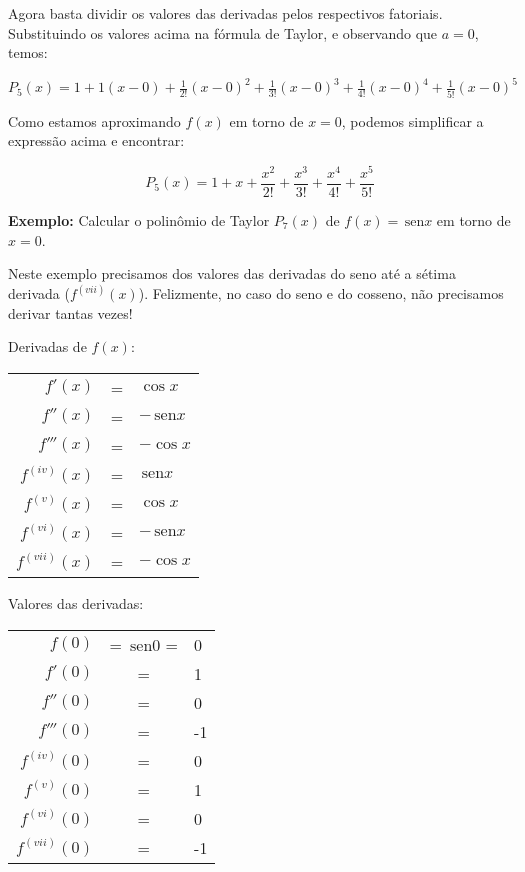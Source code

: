 \documentclass[a4paper]{article}
\providecommand{\sin}{} \renewcommand{\sin}{\hspace{2pt}\mathrm{sen}}
\begin{document}
Agora basta dividir os valores das derivadas pelos respectivos fatoriais.
Substituindo os valores acima na fórmula de Taylor, e observando que $a=0$, temos:

$P_5(x) = 1+ 1(x-0) + \frac{1}{2!}(x-0)^2 + \frac{1}{3!}(x-0)^3 + \frac{1}{4!}(x-0)^4 + \frac{1}{5!}(x-0)^5$

Como estamos aproximando $f(x)$ em torno de $x=0$, podemos simplificar a expressão acima e encontrar:

\begin{displaymath}
  P_5(x) = 1+ x + \frac{x^2}{2!} + \frac{x^3}{3!} + \frac{x^4}{4!} + \frac{x^5}{5!}
\end{displaymath}

{\bf Exemplo:} Calcular o polinômio de Taylor $P_7(x)$ de $f(x)=\sin x$ em torno de $x=0$.

Neste exemplo precisamos dos valores das derivadas do seno até a sétima derivada ($f^{(vii)}(x)$).
Felizmente, no caso do seno e do cosseno, não precisamos derivar tantas vezes!

\begin{multicols}{2}

Derivadas de $f(x)$:

  \begin{tabular}{rcl}
    $f'(x)$ &=& $\cos x$\\
    $f''(x)$ &=& $-\sin x$\\
    $f'''(x)$ &=& $-\cos x$\\
    $f^{(iv)}(x)$ &=& $\sin x$\\
    $f^{(v)}(x)$ &=& $\cos x$\\
    $f^{(vi)}(x)$ &=& $-\sin x$\\
    $f^{(vii)}(x)$ &=& $-\cos x$\\
  \end{tabular}

  \columnbreak

Valores das derivadas:

  \begin{tabular}{rcl}
    $f(0)$ &= $\sin 0$ =& 0\\
    $f'(0)$ &=& 1\\
    $f''(0)$ &=& 0\\
    $f'''(0)$ &=& -1\\
    $f^{(iv)}(0)$ &=& 0\\
    $f^{(v)}(0)$ &=& 1\\
    $f^{(vi)}(0)$ &=& 0\\
    $f^{(vii)}(0)$ &=& -1\\
  \end{tabular}
\end{multicols}
\end{document}
